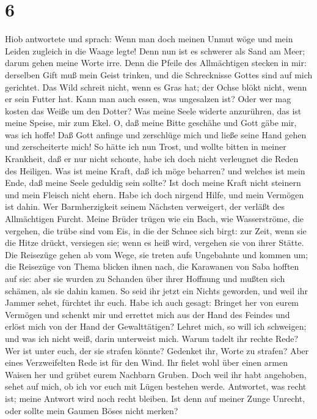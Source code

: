 \hypertarget{section-5}{%
\section{6}\label{section-5}}

 Hiob antwortete und sprach:  Wenn man doch
meinen Unmut wöge und mein Leiden zugleich in die Waage legte!
 Denn nun ist es schwerer als Sand am Meer; darum gehen
meine Worte irre.  Denn die Pfeile des Allmächtigen stecken
in mir: derselben Gift muß mein Geist trinken, und die Schrecknisse
Gottes sind auf mich gerichtet.  Das Wild schreit nicht,
wenn es Gras hat; der Ochse blökt nicht, wenn er sein Futter hat.
 Kann man auch essen, was ungesalzen ist? Oder wer mag
kosten das Weiße um den Dotter?  Was meine Seele widerte
anzurühren, das ist meine Speise, mir zum Ekel.  O, daß
meine Bitte geschähe und Gott gäbe mir, was ich hoffe!  Daß
Gott anfinge und zerschlüge mich und ließe seine Hand gehen und
zerscheiterte mich!  So hätte ich nun Trost, und wollte
bitten in meiner Krankheit, daß er nur nicht schonte, habe ich doch
nicht verleugnet die Reden des Heiligen.  Was ist meine
Kraft, daß ich möge beharren? und welches ist mein Ende, daß meine Seele
geduldig sein sollte?  Ist doch meine Kraft nicht steinern
und mein Fleisch nicht ehern.  Habe ich doch nirgend Hilfe,
und mein Vermögen ist dahin.  Wer Barmherzigkeit seinem
Nächsten verweigert, der verläßt des Allmächtigen Furcht. 
Meine Brüder trügen wie ein Bach, wie Wasserströme, die vergehen,
 die trübe sind vom Eis, in die der Schnee sich birgt:
 zur Zeit, wenn sie die Hitze drückt, versiegen sie; wenn
es heiß wird, vergehen sie von ihrer Stätte.  Die Reisezüge
gehen ab vom Wege, sie treten aufs Ungebahnte und kommen um;
 die Reisezüge von Thema blicken ihnen nach, die Karawanen
von Saba hofften auf sie:  aber sie wurden zu Schanden über
ihrer Hoffnung und mußten sich schämen, als sie dahin kamen.
 So seid ihr jetzt ein Nichts geworden, und weil ihr Jammer
sehet, fürchtet ihr euch.  Habe ich auch gesagt: Bringet
her von eurem Vermögen und schenkt mir  und errettet mich
aus der Hand des Feindes und erlöst mich von der Hand der Gewalttätigen?
 Lehret mich, so will ich schweigen; und was ich nicht
weiß, darin unterweist mich.  Warum tadelt ihr rechte Rede?
Wer ist unter euch, der sie strafen könnte?  Gedenket ihr,
Worte zu strafen? Aber eines Verzweifelten Rede ist für den Wind.
 Ihr fielet wohl über einen armen Waisen her und grübet
eurem Nachbarn Gruben.  Doch weil ihr habt angehoben, sehet
auf mich, ob ich vor euch mit Lügen bestehen werde. 
Antwortet, was recht ist; meine Antwort wird noch recht bleiben.
 Ist denn auf meiner Zunge Unrecht, oder sollte mein Gaumen
Böses nicht merken?

